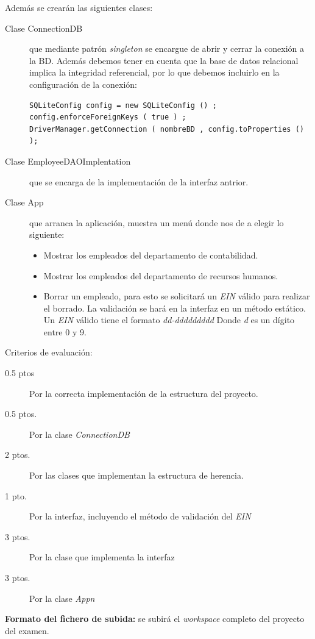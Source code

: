 \documentclass[addpoints,12pt]{exam}
\begin{document}
\begin{questions}
\begin{figure}[h]
\begin{center}
\end{center}
\end{figure}
Además se crearán las siguientes clases:
\begin{description}
\item[Clase ConnectionDB] que mediante patrón \emph{singleton} se encargue de abrir y cerrar la conexión a la BD. Además debemos tener en cuenta que la base de datos relacional implica la integridad referencial, por lo que debemos incluirlo en la configuración de la conexión:
\begin{verbatim}
SQLiteConfig config = new SQLiteConfig () ;
config.enforceForeignKeys ( true ) ;
DriverManager.getConnection ( nombreBD , config.toProperties () );
\end{verbatim}
\item[Clase EmployeeDAOImplentation] que se encarga de la implementación de la interfaz antrior.
\newpage
\item[Clase App] que arranca la aplicación, muestra un menú donde nos de a elegir  lo siguiente:
\begin{itemize}
\item Mostrar los empleados del departamento de contabilidad.
\item Mostrar los empleados del departamento de recursos humanos.
\item Borrar un empleado, para esto se solicitará  un \emph{EIN} válido para realizar el borrado. La validación se hará en la interfaz en un método estático. Un \emph{EIN} válido tiene el formato \emph{dd-ddddddddd} Donde \emph{d} es un dígito entre 0 y 9.
\end{itemize}
\end{description}


Criterios de evaluación:
\begin{description}
\item[0.5 ptos] Por la correcta implementación de la estructura del proyecto.
\item[0.5 ptos.] Por la clase \emph{ConnectionDB}
\item[2 ptos.] Por las clases que implementan la estructura de herencia.
\item[1 pto.] Por la interfaz, incluyendo el método de validación del \emph{EIN}
\item[3 ptos.] Por la clase que implementa la interfaz
\item[3 ptos.] Por la clase \emph{Appn}
\end{description}
\textbf{Formato del fichero de subida:} se subirá el \emph{workspace} completo del proyecto del examen.
\end{questions}
\end{document}
